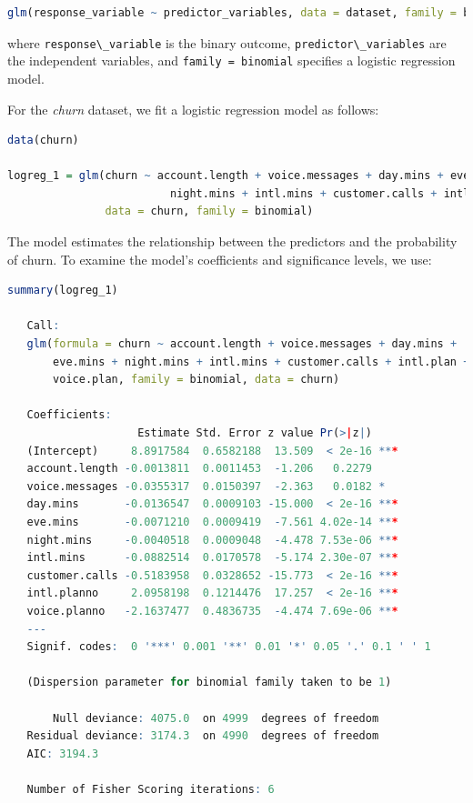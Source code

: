 \documentclass[
]{book}
\newcommand{\passthrough}[1]{#1}
\theoremstyle{definition}
\theoremstyle{definition}
\theoremstyle{definition}
\theoremstyle{definition}
\theoremstyle{remark}
\begin{document}
\begin{lstlisting}[language=R]
glm(response_variable ~ predictor_variables, data = dataset, family = binomial)
\end{lstlisting}

where \passthrough{\lstinline!response\_variable!} is the binary outcome, \passthrough{\lstinline!predictor\_variables!} are the independent variables, and \passthrough{\lstinline!family = binomial!} specifies a logistic regression model.

For the \emph{churn} dataset, we fit a logistic regression model as follows:

\begin{lstlisting}[language=R]
data(churn)

logreg_1 = glm(churn ~ account.length + voice.messages + day.mins + eve.mins + 
                         night.mins + intl.mins + customer.calls + intl.plan + voice.plan, 
               data = churn, family = binomial)
\end{lstlisting}

The model estimates the relationship between the predictors and the probability of churn. To examine the model's coefficients and significance levels, we use:

\begin{lstlisting}[language=R]
summary(logreg_1)
   
   Call:
   glm(formula = churn ~ account.length + voice.messages + day.mins + 
       eve.mins + night.mins + intl.mins + customer.calls + intl.plan + 
       voice.plan, family = binomial, data = churn)
   
   Coefficients:
                    Estimate Std. Error z value Pr(>|z|)    
   (Intercept)     8.8917584  0.6582188  13.509  < 2e-16 ***
   account.length -0.0013811  0.0011453  -1.206   0.2279    
   voice.messages -0.0355317  0.0150397  -2.363   0.0182 *  
   day.mins       -0.0136547  0.0009103 -15.000  < 2e-16 ***
   eve.mins       -0.0071210  0.0009419  -7.561 4.02e-14 ***
   night.mins     -0.0040518  0.0009048  -4.478 7.53e-06 ***
   intl.mins      -0.0882514  0.0170578  -5.174 2.30e-07 ***
   customer.calls -0.5183958  0.0328652 -15.773  < 2e-16 ***
   intl.planno     2.0958198  0.1214476  17.257  < 2e-16 ***
   voice.planno   -2.1637477  0.4836735  -4.474 7.69e-06 ***
   ---
   Signif. codes:  0 '***' 0.001 '**' 0.01 '*' 0.05 '.' 0.1 ' ' 1
   
   (Dispersion parameter for binomial family taken to be 1)
   
       Null deviance: 4075.0  on 4999  degrees of freedom
   Residual deviance: 3174.3  on 4990  degrees of freedom
   AIC: 3194.3
   
   Number of Fisher Scoring iterations: 6
\end{lstlisting}
\end{document}
